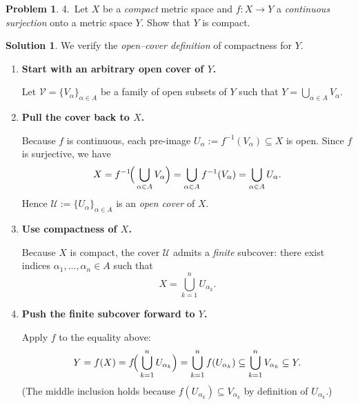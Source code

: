 \documentclass[12pt]{article}
\theoremstyle{definition} %
\newtheorem{solution}{Solution}
\newtheorem{problem}{Problem}
\theoremstyle{plain} %
\begin{document}
      \begin{problem}
        4.\ Let \(X\) be a \emph{compact} metric space and
        \(f:X\to Y\) a \emph{continuous surjection} onto a metric space \(Y\).
        Show that \(Y\) is compact.
        \end{problem}
        
        \begin{solution}
        We verify the \emph{open--cover definition} of compactness for \(Y\).
        
        \begin{enumerate}[]
        \item \textbf{Start with an arbitrary open cover of \(Y\).}
        
        Let \(\mathcal{V}=\{V_\alpha\}_{\alpha\in A}\) be a family of open
        subsets of \(Y\) such that \(\displaystyle Y=\bigcup_{\alpha\in A}V_\alpha\).
        
        \item \textbf{Pull the cover back to \(X\).}
        
        Because \(f\) is continuous, each pre-image
        \(U_\alpha:=f^{-1}(V_\alpha)\subseteq X\) is open.
        Since \(f\) is surjective, we have
        \[
           X
           =f^{-1}\!\Bigl(\,\bigcup_{\alpha\in A}V_\alpha\Bigr)
           =\bigcup_{\alpha\in A}f^{-1}(V_\alpha)
           =\bigcup_{\alpha\in A}U_\alpha .
        \]
        Hence \(\mathcal{U}:=\{U_\alpha\}_{\alpha\in A}\) is an \emph{open cover} of \(X\).
        
        \item \textbf{Use compactness of \(X\).}
        
        Because \(X\) is compact, the cover \(\mathcal{U}\) admits a
        \emph{finite} subcover:
        there exist indices \(\alpha_1,\dots,\alpha_n\in A\) such that
        \[
             X=\bigcup_{k=1}^{n} U_{\alpha_k}.
        \]
        
        \item \textbf{Push the finite subcover forward to \(Y\).}
        
        Apply \(f\) to the equality above:
        \[
           Y=f(X)=f\!\Bigl(\,\bigcup_{k=1}^{n}U_{\alpha_k}\Bigr)
             =\bigcup_{k=1}^{n} f(U_{\alpha_k})
             \subseteq\bigcup_{k=1}^{n} V_{\alpha_k}
             \subseteq Y .
        \]
        (The middle inclusion holds because \(f(U_{\alpha_k})\subseteq V_{\alpha_k}\)
        by definition of \(U_{\alpha_k}\).)
        

\end{enumerate}
\end{solution}
\end{document}
